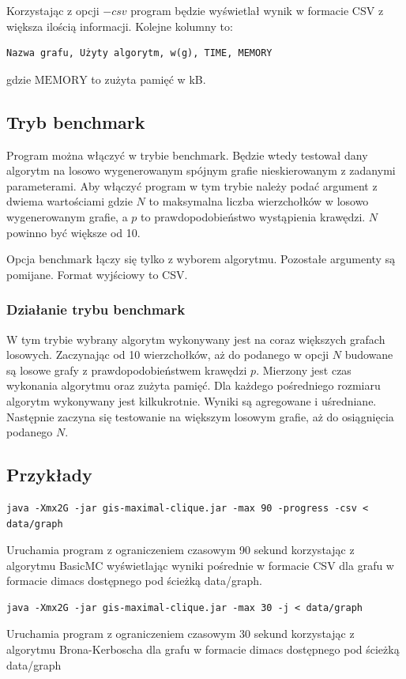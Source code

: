 \documentclass[12pt, a4paper]{article}
\begin{document}
Korzystając z opcji $-csv$ program będzie wyświetlał wynik w formacie CSV z większa ilością informacji. Kolejne kolumny to:
\begin{verbatim}
Nazwa grafu, Użyty algorytm, w(g), TIME, MEMORY
\end{verbatim}

gdzie $\text{MEMORY}$ to zużyta pamięć w kB.

\subsection{Tryb benchmark}
Program można włączyć w trybie benchmark. Będzie wtedy testował dany algorytm na losowo wygenerowanym spójnym grafie nieskierowanym z zadanymi parameterami. Aby włączyć program w tym trybie należy podać argument z dwiema wartościami \emph{} gdzie $N$ to maksymalna liczba wierzchołków w losowo wygenerowanym grafie, a $p$ to prawdopodobieństwo wystąpienia krawędzi. $N$ powinno być większe od 10.

Opcja benchmark łączy się tylko z wyborem algorytmu. Pozostałe argumenty są pomijane. Format wyjściowy to CSV.

\subsubsection{Działanie trybu benchmark}
W tym trybie wybrany algorytm wykonywany jest na coraz większych grafach losowych. Zaczynając od 10 wierzchołków, aż do podanego w opcji $N$ budowane są losowe grafy z prawdopodobieństwem krawędzi $p$. Mierzony jest czas wykonania algorytmu oraz zużyta pamięć. Dla każdego pośredniego rozmiaru algorytm wykonywany jest kilkukrotnie. Wyniki są agregowane i uśredniane. Następnie zaczyna się testowanie na większym losowym grafie, aż do osiągnięcia podanego $N$.

\subsection{Przykłady}

\begin{verbatim}
java -Xmx2G -jar gis-maximal-clique.jar -max 90 -progress -csv < data/graph
\end{verbatim}
Uruchamia program z ograniczeniem czasowym 90 sekund korzystając z algorytmu BasicMC wyświetlając wyniki pośrednie w formacie CSV dla grafu w formacie dimacs dostępnego pod ścieżką data/graph.

\begin{verbatim}
java -Xmx2G -jar gis-maximal-clique.jar -max 30 -j < data/graph 
\end{verbatim}
Uruchamia program z ograniczeniem czasowym 30 sekund korzystając z algorytmu Brona-Kerboscha dla grafu w formacie dimacs dostępnego pod ścieżką data/graph
\end{document}
